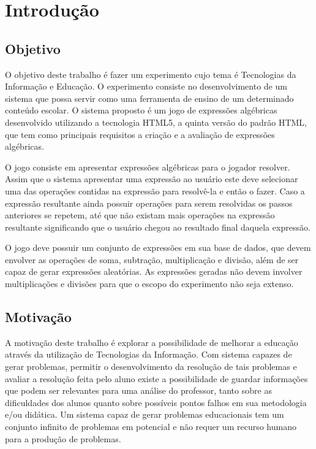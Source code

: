 \chapter*[Introdução]{Introdução}

\section{Objetivo}
O objetivo deste trabalho é fazer um experimento cujo tema é Tecnologias da Informação e Educação. O experimento consiste no desenvolvimento de um sistema que possa servir como uma ferramenta de ensino de um determinado conteúdo escolar. O sistema proposto é um jogo de expressões algébricas desenvolvido utilizando a tecnologia HTML5, a quinta versão do padrão HTML, que tem como principais requisitos a criação e a avaliação de expressões algébricas.

	O jogo consiste em apresentar expressões algébricas para o jogador resolver.
Assim que o sistema apresentar uma expressão ao usuário este deve selecionar uma das operações contidas na expressão para resolvê-la e então o fazer. Caso a expressão resultante ainda possuir operações para serem resolvidas os passos anteriores se repetem, até que não existam mais operações na expressão resultante significando que o usuário chegou ao resultado final daquela expressão.

	O jogo deve possuir um conjunto de expressões em sua base de dados, que devem envolver as operações de soma, subtração, multiplicação e divisão, além de ser capaz de gerar expressões aleatórias. As expressões geradas não devem involver multiplicações e divisões para que o escopo do experimento não seja extenso.

\section{Motivação}
A motivação deste trabalho é explorar a possibilidade de melhorar a educação através da utilização de Tecnologias da Informação. Com sistema capazes de gerar problemas, permitir o desenvolvimento da resolução de tais problemas e avaliar a resolução feita pelo aluno existe a possibilidade de guardar informações que podem ser relevantes para uma análise do professor, tanto sobre as dificuldades dos alunos quanto sobre possíveis pontos falhos em sua metodologia e/ou didática. Um sistema capaz de gerar problemas educacionais tem um conjunto infinito de problemas em potencial e não requer um recurso humano para a produção de problemas.
	
